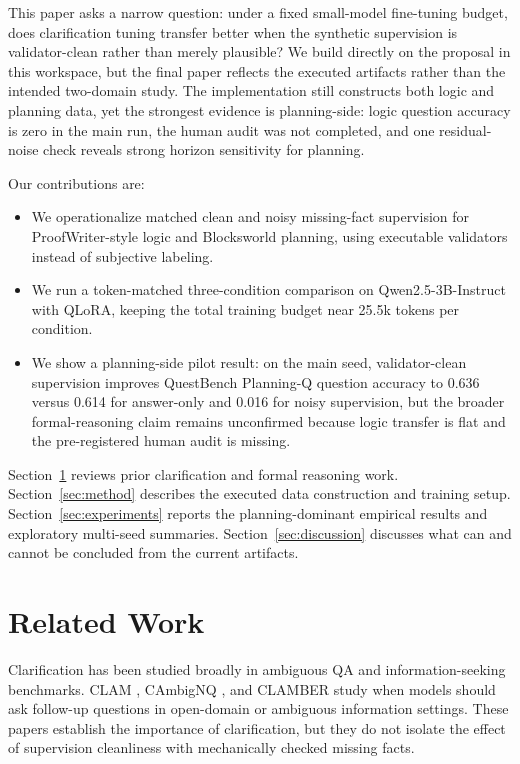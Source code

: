 This paper asks a narrow question: under a fixed small-model fine-tuning budget, does clarification tuning transfer better when the synthetic supervision is validator-clean rather than merely plausible? We build directly on the proposal in this workspace, but the final paper reflects the executed artifacts rather than the intended two-domain study. The implementation still constructs both logic and planning data, yet the strongest evidence is planning-side: logic question accuracy is zero in the main run, the human audit was not completed, and one residual-noise check reveals strong horizon sensitivity for planning.

Our contributions are:
\begin{itemize}[leftmargin=*]
  \item We operationalize matched clean and noisy missing-fact supervision for ProofWriter-style logic and Blocksworld planning, using executable validators instead of subjective labeling.
  \item We run a token-matched three-condition comparison on Qwen2.5-3B-Instruct with QLoRA, keeping the total training budget near 25.5k tokens per condition.
  \item We show a planning-side pilot result: on the main seed, validator-clean supervision improves QuestBench Planning-Q question accuracy to 0.636 versus 0.614 for answer-only and 0.016 for noisy supervision, but the broader formal-reasoning claim remains unconfirmed because logic transfer is flat and the pre-registered human audit is missing.
\end{itemize}

Section~\ref{sec:related} reviews prior clarification and formal reasoning work. Section~\ref{sec:method} describes the executed data construction and training setup. Section~\ref{sec:experiments} reports the planning-dominant empirical results and exploratory multi-seed summaries. Section~\ref{sec:discussion} discusses what can and cannot be concluded from the current artifacts.

\section{Related Work}
\label{sec:related}
Clarification has been studied broadly in ambiguous QA and information-seeking benchmarks. CLAM \citep{kuhn2023clam}, CAmbigNQ \citep{lee-etal-2023-asking}, and CLAMBER \citep{zhang-etal-2024-clamber} study when models should ask follow-up questions in open-domain or ambiguous information settings. These papers establish the importance of clarification, but they do not isolate the effect of supervision cleanliness with mechanically checked missing facts.

